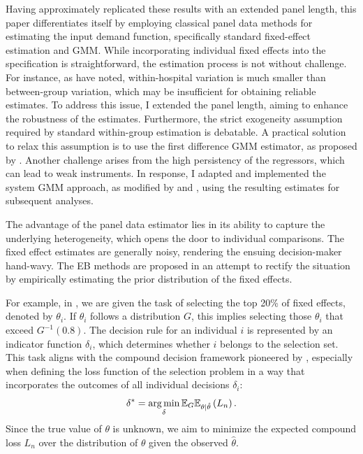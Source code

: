 \documentclass[12pt]{article}
\begin{document}
Having approximately replicated these results with an extended panel length,
this paper differentiates itself by employing classical panel data methods for
estimating the input demand function, specifically standard fixed-effect
estimation and GMM. While incorporating individual fixed effects into the
specification is straightforward, the estimation process is not without
challenge. For instance, as \citet{croiset2024hospitals} have noted,
within-hospital variation is much smaller than between-group variation, which
may be insufficient for obtaining reliable estimates. To address this issue, I
extended the panel length, aiming to enhance the robustness of the estimates.
Furthermore, the strict exogeneity assumption required by standard within-group
estimation is debatable. A practical solution to relax this assumption is to
use the first difference GMM estimator, as proposed by
\citet{arellano1991some}. Another challenge arises from the high persistency of
the regressors, which can lead to weak instruments. In response, I adapted and
implemented the system GMM approach, as modified by \citet{arellano1995another}
and \citet{blundell1998initial}, using the resulting estimates for subsequent
analyses.

The advantage of the panel data estimator lies in its ability to capture the
underlying heterogeneity, which opens the door to individual comparisons. The
fixed effect estimates are generally noisy, rendering the ensuing
decision-maker hand-wavy. The EB methods are proposed in an attempt to rectify
the situation by empirically estimating the prior distribution of the fixed
effects.

For example, in \cite{gu2023invidious}, we are given the task of selecting the
top 20\% of fixed effects, denoted by $\theta_i$. If $\theta_i$ follows a
distribution $G$, this implies selecting those $\theta_i$ that exceed
$G^{-1}(0.8)$. The decision rule for an individual $i$ is represented by an
indicator function $\delta_i$, which determines whether $i$ belongs to the
selection set. This task aligns with the compound decision framework pioneered
by \cite{herbert1956empirical}, especially when defining the loss function of
the selection problem in a way that incorporates the outcomes of all individual
decisions $\delta_i$:
\begin{equation*}
    \delta^* = \operatorname*{arg\,min}_{\delta} \mathbb{E}_G\mathbb{E}_{\theta|\hat{\theta}}\left(L_n\right).
\end{equation*}
Since the true value of $\theta$ is unknown, we aim to minimize the expected compound loss $L_n$ over the distribution of $\theta$ given the observed $\hat{\theta}$.
\end{document}
